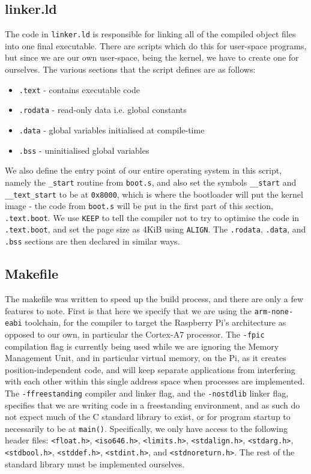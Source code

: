 \documentclass[10pt,a4paper]{article}
\newcommand{\code}[1]{\texttt{#1}}
\begin{document}
\subsection*{linker.ld}
The code in \code{linker.ld} is responsible for linking all of the compiled
object files into one final executable. There are scripts which do this for
user-space programs, but since we are our own user-space, being the kernel, we
have to create one for ourselves. The various sections that the script defines
are as follows:
\begin{itemize}
    \itemsep0em
    \item \code{.text} - contains executable code
    \item \code{.rodata} - read-only data i.e. global constants
    \item \code{.data} - global variables initialised at compile-time
    \item \code{.bss} - uninitialised global variables
\end{itemize}

We also define the entry point of our entire operating system in this script,
namely the \code{\_start} routine from \code{boot.s}, and also set the symbols
\code{\_\_start} and \code{\_\_text\_start} to be at \code{0x8000}, which is
where the bootloader will put the kernel image - the code from \code{boot.s}
will be put in the first part of this section, \code{.text.boot}. We use
\code{KEEP} to tell the compiler not to try to optimise the code in
\code{.text.boot}, and set the page size as 4KiB using \code{ALIGN}. The
\code{.rodata}, \code{.data}, and \code{.bss} sections are then declared in
similar ways.

\subsection*{Makefile}
The makefile was written to speed up the build process, and there are only a few
features to note. First is that here we specify that we are using the
\code{arm-none-eabi} toolchain, for the compiler to target the Raspberry Pi's
architecture as opposed to our own, in particular the Cortex-A7 processor. The
\code{-fpic} compilation flag is currently being used while we are ignoring the
Memory Management Unit, and in particular virtual memory, on the Pi, as it
creates position-independent code, and will keep separate applications from
interfering with each other within this single address space when processes are
implemented. The \code{-ffreestanding} compiler and linker flag, and the
\code{-nostdlib} linker flag, specifies that we are writing code in a
freestanding environment, and as such do not expect much of the C standard
library to exist, or for program startup to necessarily to be at \code{main()}.
Specifically, we only have access to the following header files:
\code{<float.h>}, \code{<iso646.h>}, \code{<limits.h>}, \code{<stdalign.h>},
\code{<stdarg.h>}, \code{<stdbool.h>}, \code{<stddef.h>}, \code{<stdint.h>}, and
\code{<stdnoreturn.h>}. The rest of the standard library must be implemented
ourselves.
\end{document}
